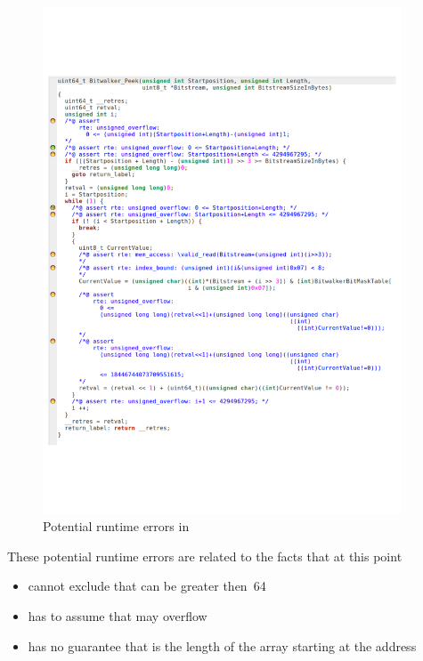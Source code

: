 \begin{figure}[hbt]
\begin{center}
\includegraphics[width=0.95\textwidth]{figures/peek-wp.pdf}
\caption{\label{fig:peek-wp} Potential runtime errors in \peek}
\end{center}
\end{figure}

These potential runtime errors are related to the facts that at this point \framacwp
\begin{itemize}
\item cannot exclude that  can be greater then~64 
\item has to assume that  may overflow
\item has no guarantee that  is the length 
      of the array starting at the address 
\end{itemize}

